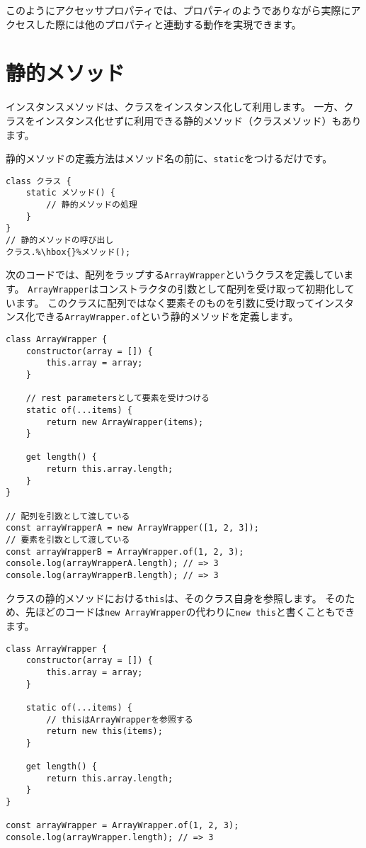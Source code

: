 このようにアクセッサプロパティでは、プロパティのようでありながら実際にアクセスした際には他のプロパティと連動する動作を実現できます。

\hypertarget{static-method}{%
\section{静的メソッド}\label{static-method}}

インスタンスメソッドは、クラスをインスタンス化して利用します。
一方、クラスをインスタンス化せずに利用できる静的メソッド（クラスメソッド）もあります。

静的メソッドの定義方法はメソッド名の前に、\texttt{static}をつけるだけです。

\begin{lstlisting}[escapechar=\%]
class クラス {
    static メソッド() {
        // 静的メソッドの処理
    }
}
// 静的メソッドの呼び出し
クラス.%\hbox{}%メソッド();
\end{lstlisting}

次のコードでは、配列をラップする\texttt{ArrayWrapper}というクラスを定義しています。\enlargethispage{\baselineskip}
\texttt{ArrayWrapper}はコンストラクタの引数として配列を受け取って初期化しています。
このクラスに配列ではなく要素そのものを引数に受け取ってインスタンス化できる\texttt{ArrayWrapper.of}という静的メソッドを定義します。

\begin{lstlisting}
class ArrayWrapper {
    constructor(array = []) {
        this.array = array;
    }

    // rest parametersとして要素を受けつける
    static of(...items) {
        return new ArrayWrapper(items);
    }

    get length() {
        return this.array.length;
    }
}

// 配列を引数として渡している
const arrayWrapperA = new ArrayWrapper([1, 2, 3]);
// 要素を引数として渡している
const arrayWrapperB = ArrayWrapper.of(1, 2, 3);
console.log(arrayWrapperA.length); // => 3
console.log(arrayWrapperB.length); // => 3
\end{lstlisting}

クラスの静的メソッドにおける\texttt{this}は、そのクラス自身を参照します。
そのため、先ほどのコードは\texttt{new ArrayWrapper}の代わりに\texttt{new this}と書くこともできます。

\begin{lstlisting}
class ArrayWrapper {
    constructor(array = []) {
        this.array = array;
    }

    static of(...items) {
        // thisはArrayWrapperを参照する
        return new this(items);
    }

    get length() {
        return this.array.length;
    }
}

const arrayWrapper = ArrayWrapper.of(1, 2, 3);
console.log(arrayWrapper.length); // => 3
\end{lstlisting}

